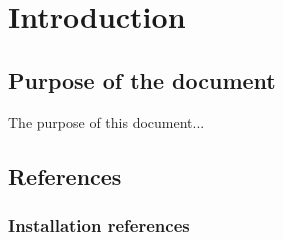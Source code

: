 \documentclass[ManualeSviluppatore.tex]{subfiles}
\begin{document}
\chapter{Introduction}

	\section{Purpose of the document}
	The purpose of this document...
	
	\scopoProdottoEN
	
	\section{References}
	\subsection{Installation references}
\end{document}
